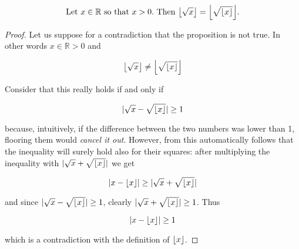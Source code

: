 \documentclass{article}
\title{}
\author{Adam Fiedler}
\date{August 1, 2018}
\DeclarePairedDelimiter{\floor}{\lfloor}{\rfloor}
\begin{document}
\maketitle

\[\text{Let } x \in \mathbb{R} \text{ so that } x > 0.\text{ Then } \floor*{\sqrt{x}} = \floor*{\sqrt{\floor*{x}}}. \]

\begin{proof}

Let us suppose for a contradiction that the proposition is not true. In other words $x \in \mathbb{R} > 0$ and

\[ \floor*{\sqrt{x}} \neq \floor*{\sqrt{\floor*{x}}} \] 

Consider that this really holds if and only if

\[ | \sqrt{x} - \sqrt{\floor*{x}} | \geq 1 \]

because, intuitively, if the difference between the two numbers was lower than 1, flooring them would \emph{cancel it out}. However, from this automatically follows that the inequality will surely hold also for their squares: after multiplying the inequality with $| \sqrt{x} + \sqrt{\floor*{x}} |$ we get

\[ | x - \floor*{x} | \geq | \sqrt{x} + \sqrt{\floor*{x}} | \]

and since $| \sqrt{x} - \sqrt{\floor*{x}} | \geq 1$, clearly $| \sqrt{x} + \sqrt{\floor*{x}} | \geq 1$. Thus

\[ | x - \floor*{x} | \geq 1 \]

which is a contradiction with the definition of $\floor*{x}$.


\end{proof}
\end{document}
